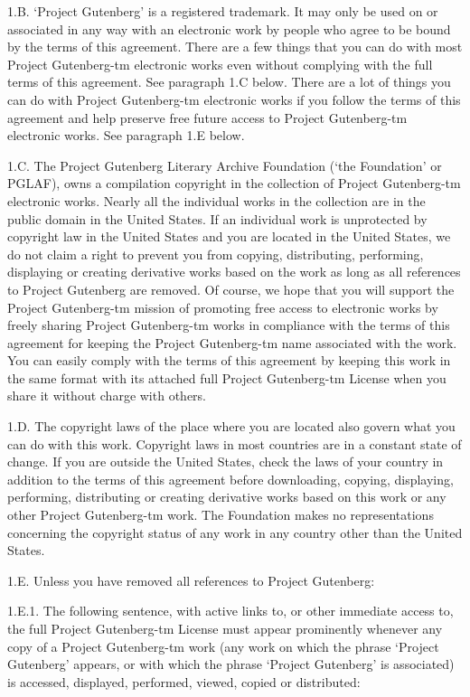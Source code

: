 \documentclass[oneside]{book}
\begin{document}
\begin{text}
1.B. `Project Gutenberg' is a registered trademark. It may only be
used on or associated in any way with an electronic work by people who
agree to be bound by the terms of this agreement. There are a few
things that you can do with most Project Gutenberg-tm electronic works
even without complying with the full terms of this agreement. See
paragraph 1.C below. There are a lot of things you can do with Project
Gutenberg-tm electronic works if you follow the terms of this
agreement and help preserve free future access to Project Gutenberg-tm
electronic works. See paragraph 1.E below.

1.C. The Project Gutenberg Literary Archive Foundation (`the
Foundation' or PGLAF), owns a compilation copyright in the collection
of Project Gutenberg-tm electronic works. Nearly all the individual
works in the collection are in the public domain in the United
States. If an individual work is unprotected by copyright law in the
United States and you are located in the United States, we do not
claim a right to prevent you from copying, distributing, performing,
displaying or creating derivative works based on the work as long as
all references to Project Gutenberg are removed. Of course, we hope
that you will support the Project Gutenberg-tm mission of promoting
free access to electronic works by freely sharing Project Gutenberg-tm
works in compliance with the terms of this agreement for keeping the
Project Gutenberg-tm name associated with the work. You can easily
comply with the terms of this agreement by keeping this work in the
same format with its attached full Project Gutenberg-tm License when
you share it without charge with others.

1.D. The copyright laws of the place where you are located also govern
what you can do with this work. Copyright laws in most countries are
in a constant state of change. If you are outside the United States,
check the laws of your country in addition to the terms of this
agreement before downloading, copying, displaying, performing,
distributing or creating derivative works based on this work or any
other Project Gutenberg-tm work. The Foundation makes no
representations concerning the copyright status of any work in any
country other than the United States.

1.E. Unless you have removed all references to Project Gutenberg:

1.E.1. The following sentence, with active links to, or other
immediate access to, the full Project Gutenberg-tm License must appear
prominently whenever any copy of a Project Gutenberg-tm work (any work
on which the phrase `Project Gutenberg' appears, or with which the
phrase `Project Gutenberg' is associated) is accessed, displayed,
performed, viewed, copied or distributed:


\end{text}
\end{document}
